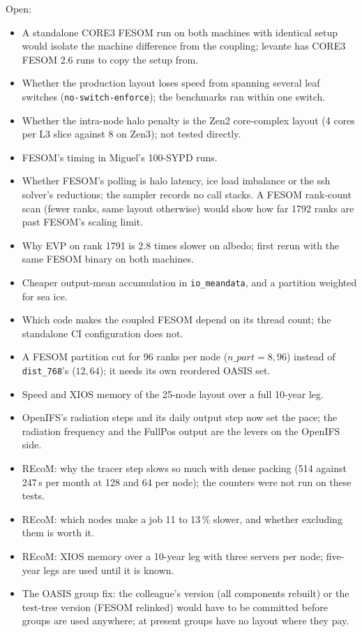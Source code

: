 \documentclass[11pt,a4paper]{article}
\begin{document}
Open:
\begin{itemize}
\item A standalone CORE3 FESOM run on both machines with identical setup would isolate the machine difference from the coupling; levante has CORE3 FESOM 2.6 runs to copy the setup from.
\item Whether the production layout loses speed from spanning several leaf switches (\texttt{no-switch-enforce}); the benchmarks ran within one switch.
\item Whether the intra-node halo penalty is the Zen2 core-complex layout (4 cores per L3 slice against 8 on Zen3); not tested directly.
\item FESOM's timing in Miguel's 100-SYPD runs.
\item Whether FESOM's polling is halo latency, ice load imbalance or the ssh solver's reductions; the sampler records no call stacks. A FESOM rank-count scan (fewer ranks, same layout otherwise) would show how far 1792 ranks are past FESOM's scaling limit.
\item Why EVP on rank 1791 is 2.8 times slower on albedo; first rerun with the same FESOM binary on both machines.
\item Cheaper output-mean accumulation in \texttt{io\_meandata}, and a partition weighted for sea ice.
\item Which code makes the coupled FESOM depend on its thread count; the standalone CI configuration does not.
\item A FESOM partition cut for 96 ranks per node ($n\_part = 8, 96$) instead of \texttt{dist\_768}'s ($12, 64$); it needs its own reordered OASIS set.
\item Speed and XIOS memory of the 25-node layout over a full 10-year leg.
\item OpenIFS's radiation steps and its daily output step now set the pace; the radiation frequency and the FullPos output are the levers on the OpenIFS side.
\item REcoM: why the tracer step slows so much with dense packing (514 against 247\,s per month at 128 and 64 per node); the counters were not run on these tests.
\item REcoM: which nodes make a job 11 to 13\,\% slower, and whether excluding them is worth it.
\item REcoM: XIOS memory over a 10-year leg with three servers per node; five-year legs are used until it is known.
\item The OASIS group fix: the colleague's version (all components rebuilt) or the test-tree version (FESOM relinked) would have to be committed before groups are used anywhere; at present groups have no layout where they pay.
\end{itemize}
\end{document}
